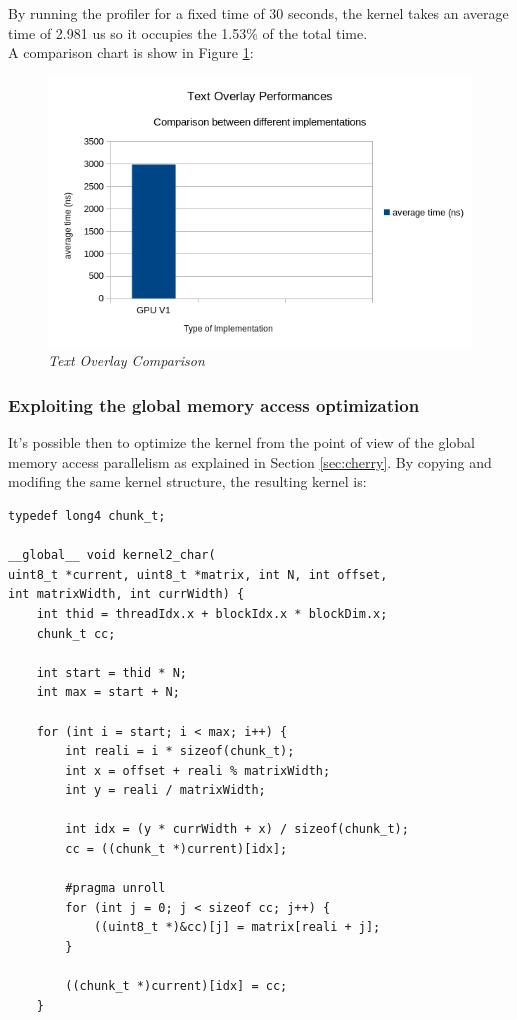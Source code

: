 \documentclass[paper=a4, fontsize=10pt]{scrartcl}	%
\begin{document}
	By running the profiler for a fixed time of 30 seconds, the kernel takes an average time of 2.981 us so it occupies the 1.53\% of the total time.\\

	A comparison chart is show in Figure \ref{fig:chart7}:

	\begin{figure}[H]
		\centering
		\includegraphics[width=0.9\linewidth]{images/chart7.png}
		\caption{\textit{Text Overlay Comparison}}
		\label{fig:chart7}
	\end{figure}

	\subsubsection{Exploiting the global memory access optimization}

	It's possible then to optimize the kernel from the point of view of the global memory access parallelism as explained in Section \ref{sec:cherry}. By copying and modifing the same kernel structure, the resulting kernel is:

	\begin{lstlisting}[style=CStyle]
typedef long4 chunk_t;

__global__ void kernel2_char(
uint8_t *current, uint8_t *matrix, int N, int offset, 
int matrixWidth, int currWidth) {
    int thid = threadIdx.x + blockIdx.x * blockDim.x;
    chunk_t cc;

    int start = thid * N;
    int max = start + N;

    for (int i = start; i < max; i++) {
        int reali = i * sizeof(chunk_t);
        int x = offset + reali % matrixWidth;
        int y = reali / matrixWidth;

        int idx = (y * currWidth + x) / sizeof(chunk_t);
        cc = ((chunk_t *)current)[idx];

        #pragma unroll
        for (int j = 0; j < sizeof cc; j++) {
            ((uint8_t *)&cc)[j] = matrix[reali + j];
        }

        ((chunk_t *)current)[idx] = cc;
    } 
	\end{lstlisting}
\end{document}
